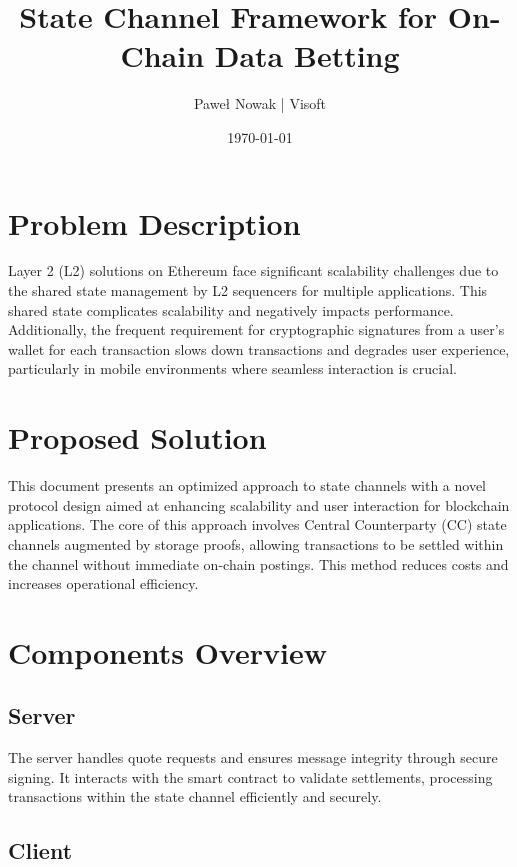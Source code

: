 \documentclass[11pt,a4paper]{article}
\title{State Channel Framework for On-Chain Data Betting}
\author{Paweł Nowak | Visoft}
\date{\today}
\begin{document}
\maketitle

\section*{Problem Description}

Layer 2 (L2) solutions on Ethereum face significant scalability challenges due to the shared state management by L2 sequencers for multiple applications. This shared state complicates scalability and negatively impacts performance. Additionally, the frequent requirement for cryptographic signatures from a user's wallet for each transaction slows down transactions and degrades user experience, particularly in mobile environments where seamless interaction is crucial.

\section*{Proposed Solution}

This document presents an optimized approach to state channels with a novel protocol design aimed at enhancing scalability and user interaction for blockchain applications. The core of this approach involves Central Counterparty (CC) state channels augmented by storage proofs, allowing transactions to be settled within the channel without immediate on-chain postings. This method reduces costs and increases operational efficiency.

\section*{Components Overview}

\subsection*{Server}

The server handles quote requests and ensures message integrity through secure signing. It interacts with the smart contract to validate settlements, processing transactions within the state channel efficiently and securely.

\subsection*{Client}
\end{document}
